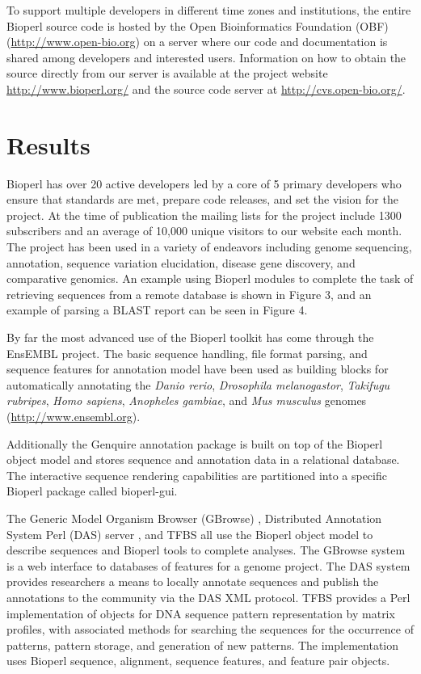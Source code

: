 \documentclass[12pt]{article}
\begin{document}
To support multiple developers in different time zones and
institutions, the entire Bioperl source code is hosted by the Open
Bioinformatics Foundation (OBF) (\url{http://www.open-bio.org}) on a
server where our code and documentation is shared among developers and
interested users.  Information on how to obtain the source directly
from our server is available at the project website
\url{http://www.bioperl.org/} and the source code server at
\url{http://cvs.open-bio.org/}.

\section{Results}

Bioperl has over 20 active developers led by a core of 5 primary developers
who ensure that standards are met, prepare code releases, and set the
vision for the project.  At the time of publication the mailing lists
for the project include 1300 subscribers and an average of 10,000
unique visitors to our website each month.  The project has been used
in a variety of endeavors including genome sequencing, annotation,
sequence variation elucidation, disease gene discovery, and
comparative genomics.  An example using Bioperl modules to complete
the task of retrieving sequences from a remote database is
shown in Figure 3, and an example of parsing a BLAST report can be
seen in Figure 4.

By far the most advanced use of the Bioperl toolkit has come through
the EnsEMBL \cite{ensembl-nar} project.  The basic sequence handling,
file format parsing, and sequence features for annotation model have
been used as building blocks for automatically annotating the
\textit{Danio rerio}, \textit{Drosophila melanogastor},
\textit{Takifugu rubripes}, \textit{Homo sapiens}, \textit{Anopheles
gambiae}, and \textit{Mus musculus} genomes
(\url{http://www.ensembl.org}).

Additionally the Genquire \cite{genquire} annotation package is built
on top of the Bioperl object model and stores sequence and annotation
data in a relational database.  The interactive sequence rendering
capabilities are partitioned into a specific Bioperl package called
bioperl-gui.

The Generic Model Organism Browser (GBrowse) \cite{gmod}, Distributed
Annotation System Perl (DAS) server \cite{das}, and TFBS \cite{tfbs}
all use the Bioperl object model to describe sequences and Bioperl
tools to complete analyses.  The GBrowse system is a web interface to
databases of features for a genome project.  The DAS system provides
researchers a means to locally annotate sequences and publish the
annotations to the community via the DAS XML protocol.  TFBS provides
a Perl implementation of objects for DNA sequence pattern
representation by matrix profiles, with associated methods for
searching the sequences for the occurrence of patterns, pattern
storage, and generation of new patterns. The implementation uses
Bioperl sequence, alignment, sequence features, and feature pair
objects.
\end{document}
